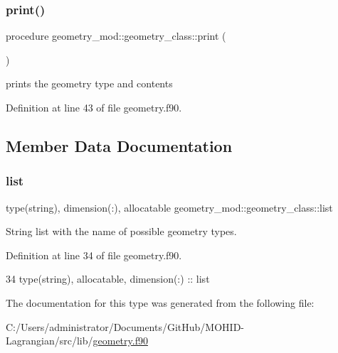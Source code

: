 \subsubsection{\texorpdfstring{print()}{print()}}
{\footnotesize\ttfamily procedure geometry\+\_\+mod\+::geometry\+\_\+class\+::print (\begin{DoxyParamCaption}{ }\end{DoxyParamCaption})\hspace{0.3cm}{\ttfamily [private]}}



prints the geometry type and contents 



Definition at line 43 of file geometry.\+f90.



\subsection{Member Data Documentation}
\mbox{\label{structgeometry__mod_1_1geometry__class_a218ff308d9bb94f4386573d7329babc6}} 
\subsubsection{\texorpdfstring{list}{list}}
{\footnotesize\ttfamily type(string), dimension(\+:), allocatable geometry\+\_\+mod\+::geometry\+\_\+class\+::list\hspace{0.3cm}{\ttfamily [private]}}



String list with the name of possible geometry types. 



Definition at line 34 of file geometry.\+f90.


\begin{DoxyCode}
34         \textcolor{keywordtype}{type}(string), \textcolor{keywordtype}{allocatable}, \textcolor{keywordtype}{dimension(:)} :: list
\end{DoxyCode}


The documentation for this type was generated from the following file\+:\begin{DoxyCompactItemize}
\item 
C\+:/\+Users/administrator/\+Documents/\+Git\+Hub/\+M\+O\+H\+I\+D-\/\+Lagrangian/src/lib/\mbox{\hyperlink{geometry_8f90}{geometry.\+f90}}\end{DoxyCompactItemize}
